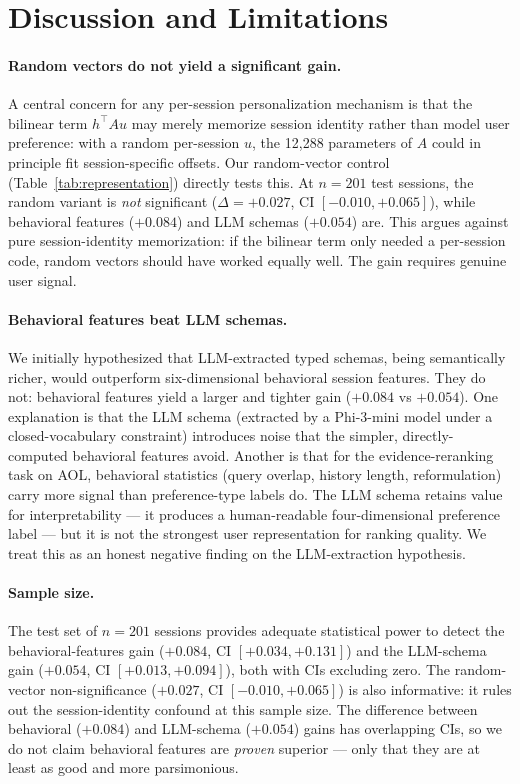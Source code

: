 \section{Discussion and Limitations}
\label{sec:discussion}

\paragraph{Random vectors do not yield a significant gain.}
A central concern for any per-session personalization mechanism is that the bilinear term $h^\top A u$ may merely memorize session identity rather than model user preference: with a random per-session $u$, the 12{,}288 parameters of $A$ could in principle fit session-specific offsets. Our random-vector control (Table~\ref{tab:representation}) directly tests this. At $n{=}201$ test sessions, the random variant is \emph{not} significant ($\Delta{=}{+}0.027$, CI $[-0.010, +0.065]$), while behavioral features ($+0.084$) and LLM schemas ($+0.054$) are. This argues against pure session-identity memorization: if the bilinear term only needed a per-session code, random vectors should have worked equally well. The gain requires genuine user signal.

\paragraph{Behavioral features beat LLM schemas.}
We initially hypothesized that LLM-extracted typed schemas, being semantically richer, would outperform six-dimensional behavioral session features. They do not: behavioral features yield a larger and tighter gain ($+0.084$ vs $+0.054$). One explanation is that the LLM schema (extracted by a Phi-3-mini model under a closed-vocabulary constraint) introduces noise that the simpler, directly-computed behavioral features avoid. Another is that for the evidence-reranking task on AOL, behavioral statistics (query overlap, history length, reformulation) carry more signal than preference-type labels do. The LLM schema retains value for interpretability --- it produces a human-readable four-dimensional preference label --- but it is not the strongest user representation for ranking quality. We treat this as an honest negative finding on the LLM-extraction hypothesis.

\paragraph{Sample size.}
The test set of $n{=}201$ sessions provides adequate statistical power to detect the behavioral-features gain ($+0.084$, CI $[+0.034, +0.131]$) and the LLM-schema gain ($+0.054$, CI $[+0.013, +0.094]$), both with CIs excluding zero. The random-vector non-significance ($+0.027$, CI $[-0.010, +0.065]$) is also informative: it rules out the session-identity confound at this sample size. The difference between behavioral ($+0.084$) and LLM-schema ($+0.054$) gains has overlapping CIs, so we do not claim behavioral features are \emph{proven} superior --- only that they are at least as good and more parsimonious.

